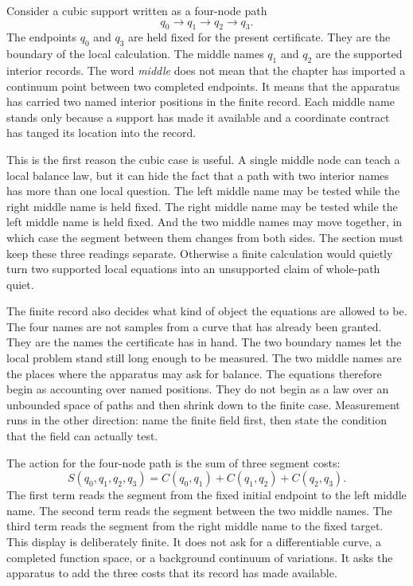 Consider a cubic support written as a four-node path
\[
  q_0 \longrightarrow q_1 \longrightarrow q_2 \longrightarrow q_3 .
\]
The endpoints \(q_0\) and \(q_3\) are held fixed for the present certificate.
They are the boundary of the local calculation. The middle names \(q_1\) and
\(q_2\) are the supported interior records. The word \emph{middle} does not mean that the chapter has imported a continuum point between two completed endpoints.
It means that the apparatus has carried two named interior positions in the
finite record. Each middle name stands only because a support has made it available and a coordinate contract has tanged its location into the record.

This is the first reason the cubic case is useful. A single middle node can
teach a local balance law, but it can hide the fact that a path with two
interior names has more than one local question. The left middle name may be
tested while the right middle name is held fixed. The right middle name may be
tested while the left middle name is held fixed. And the two middle names may
move together, in which case the segment between them changes from both sides.
The section must keep these three readings separate. Otherwise a finite
calculation would quietly turn two supported local equations into an
unsupported claim of whole-path quiet.

The finite record also decides what kind of object the equations are allowed
to be. The four names are not samples from a curve that has already been
granted. They are the names the certificate has in hand. The two boundary
names let the local problem stand still long enough to be measured. The two
middle names are the places where the apparatus may ask for balance. The
equations therefore begin as accounting over named positions. They do not
begin as a law over an unbounded space of paths and then shrink down to the
finite case. Measurement runs in the other direction: name the finite field
first, then state the condition that the field can actually test.

The action for the four-node path is the sum of three segment costs:
\[
  S(q_0,q_1,q_2,q_3)
    = C(q_0,q_1) + C(q_1,q_2) + C(q_2,q_3).
\]
The first term reads the segment from the fixed initial endpoint to the left
middle name. The second term reads the segment between the two middle names. The
third term reads the segment from the right middle name to the fixed target.
This display is deliberately finite. It does not ask for a differentiable
curve, a completed function space, or a background continuum of variations. It
asks the apparatus to add the three costs that its record has made available.

